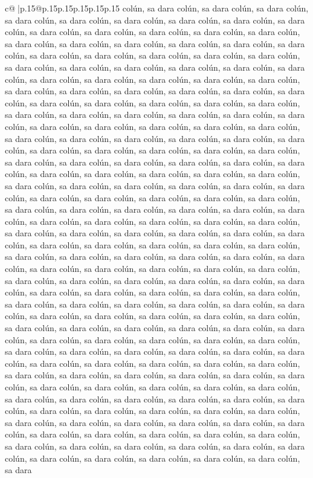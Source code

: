 \documentclass{article}
\begin{document}
{\begin{supertabular}{c@{$\;$}|p{.15\linewidth}@{}p{.15\linewidth}p{.15\linewidth}p{.15\linewidth}p{.15\linewidth}p{.15\linewidth}}
{{{colún, sa dara colún, sa dara colún, sa dara colún, sa dara colún, sa dara colún, sa dara colún, sa dara colún, sa dara colún, sa dara colún, sa dara colún, sa dara colún, sa dara colún, sa dara colún, sa dara colún, sa dara colún, sa dara colún, sa dara colún, sa dara colún, sa dara colún, sa dara colún, sa dara colún, sa dara colún, sa dara colún, sa dara colún, sa dara colún, sa dara colún, sa dara colún, sa dara colún, sa dara colún, sa dara colún, sa dara colún, sa dara colún, sa dara colún, sa dara colún, sa dara colún, sa dara colún, sa dara colún, sa dara colún, sa dara colún, sa dara colún, sa dara colún, sa dara colún, sa dara colún, sa dara colún, sa dara colún, sa dara colún, sa dara colún, sa dara colún, sa dara colún, sa dara colún, sa dara colún, sa dara colún, sa dara colún, sa dara colún, sa dara colún, sa dara colún, sa dara colún, sa dara colún, sa dara colún, sa dara colún, sa dara colún, sa dara colún, sa dara colún, sa dara colún, sa dara colún, sa dara colún, sa dara colún, sa dara colún, sa dara colún, sa dara colún, sa dara colún, sa dara colún, sa dara colún, sa dara colún, sa dara colún, sa dara colún, sa dara colún, sa dara colún, sa dara colún, sa dara colún, sa dara colún, sa dara colún, sa dara colún, sa dara colún, sa dara colún, sa dara colún, sa dara colún, sa dara colún, sa dara colún, sa dara colún, sa dara colún, sa dara colún, sa dara colún, sa dara colún, sa dara colún, sa dara colún, sa dara colún, sa dara colún, sa dara colún, sa dara colún, sa dara colún, sa dara colún, sa dara colún, sa dara colún, sa dara colún, sa dara colún, sa dara colún, sa dara colún, sa dara colún, sa dara colún, sa dara colún, sa dara colún, sa dara colún, sa dara colún, sa dara colún, sa dara colún, sa dara colún, sa dara colún, sa dara colún, sa dara colún, sa dara colún, sa dara colún, sa dara colún, sa dara colún, sa dara colún, sa dara colún, sa dara colún, sa dara colún, sa dara colún, sa dara colún, sa dara colún, sa dara colún, sa dara colún, sa dara colún, sa dara colún, sa dara colún, sa dara colún, sa dara colún, sa dara colún, sa dara colún, sa dara colún, sa dara colún, sa dara colún, sa dara colún, sa dara colún, sa dara colún, sa dara colún, sa dara colún, sa dara colún, sa dara colún, sa dara colún, sa dara colún, sa dara colún, sa dara colún, sa dara colún, sa dara colún, sa dara colún, sa dara colún, sa dara colún, sa dara colún, sa dara colún, sa dara colún, sa dara colún, sa dara colún, sa dara colún, sa dara colún, sa dara colún, sa dara colún, sa dara colún, sa dara colún, sa dara colún, sa dara colún, sa dara colún, sa dara colún, sa dara colún, sa dara colún, sa dara colún, sa dara colún, sa dara colún, sa dara colún, sa dara colún, sa dara colún, sa dara colún, sa dara colún, sa dara colún, sa dara colún, sa dara colún, sa dara colún, sa dara colún, sa dara colún, sa dara colún, sa dara colún, sa dara colún, sa dara colún, sa dara colún, sa dara colún, sa dara colún, sa dara colún, sa dara colún, sa dara colún, sa dara colún, sa dara colún, sa dara colún, sa dara colún, sa dara colún, sa dara colún, sa dara colún, sa dara colún, sa dara colún, sa dara colún, sa dara colún, sa dara colún, sa dara }}}
\end{supertabular}}
\end{document}
